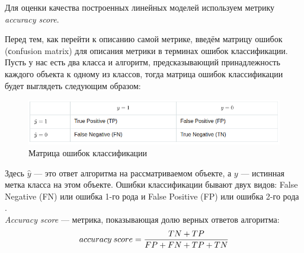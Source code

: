 Для оценки качества построенных линейных моделей используем метрику
\textit{accuracy score}.

Перед тем, как перейти к описанию самой метрике, введём матрицу ошибок (сonfusion matrix) для описания метрики
в терминах ошибок классификации.
Пусть у нас есть два класса и алгоритм, предсказывающий принадлежность каждого
объекта к одному из классов, тогда матрица ошибок классификации будет выглядеть следующим
образом:

\begin{figure}[H]
    \centering
    \includegraphics[width=\linewidth]{images/11.png}
    \caption{Матрица ошибок классификации}
    \label{fig_11}
\end{figure}


Здесь $\hat y$ — это ответ алгоритма на рассматриваемом объекте, а $y$ — истинная метка класса на
этом объекте. Ошибки классификации бывают двух видов: False Negative
(FN) или ошибка 1-го рода и False Positive (FP) или ошибка 2-го рода \cite{ML_lectures}.\\
\textit{Accuracy score} --- метрика, показывающая долю верных ответов алгоритма:
\begin{equation*}
    \large accuracy\: score = \frac{TN+TP}{FP + FN + TP + TN}
\end{equation*}



